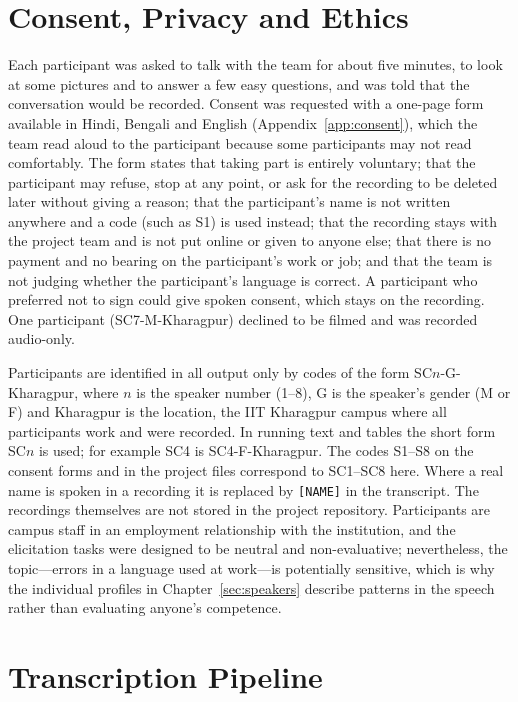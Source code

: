 \documentclass[11pt,a4paper]{report}
\begin{document}
\section{Consent, Privacy and Ethics}

Each participant was asked to talk with the team for about five minutes, to look at some pictures and to answer a few easy questions, and was told that the conversation would be recorded. Consent was requested with a one-page form available in Hindi, Bengali and English (Appendix~\ref{app:consent}), which the team read aloud to the participant because some participants may not read comfortably. The form states that taking part is entirely voluntary; that the participant may refuse, stop at any point, or ask for the recording to be deleted later without giving a reason; that the participant's name is not written anywhere and a code (such as S1) is used instead; that the recording stays with the project team and is not put online or given to anyone else; that there is no payment and no bearing on the participant's work or job; and that the team is not judging whether the participant's language is correct. A participant who preferred not to sign could give spoken consent, which stays on the recording. One participant (SC7-M-Kharagpur) declined to be filmed and was recorded audio-only.

Participants are identified in all output only by codes of the form SC$n$-G-Kharagpur, where $n$ is the speaker number (1--8), G is the speaker's gender (M or F) and Kharagpur is the location, the IIT Kharagpur campus where all participants work and were recorded. In running text and tables the short form SC$n$ is used; for example SC4 is SC4-F-Kharagpur. The codes S1--S8 on the consent forms and in the project files correspond to SC1--SC8 here. Where a real name is spoken in a recording it is replaced by \texttt{[NAME]} in the transcript. The recordings themselves are not stored in the project repository. Participants are campus staff in an employment relationship with the institution, and the elicitation tasks were designed to be neutral and non-evaluative; nevertheless, the topic---errors in a language used at work---is potentially sensitive, which is why the individual profiles in Chapter~\ref{sec:speakers} describe patterns in the speech rather than evaluating anyone's competence.

\section{Transcription Pipeline}
\end{document}
